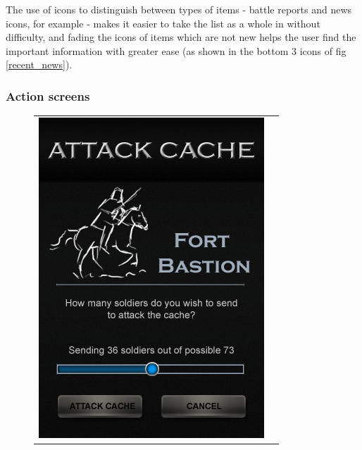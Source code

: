 The use of icons to distinguish between types of items - battle reports and news icons, for example - makes it easier to take the list as a whole in without difficulty, and fading the icons of items which are not new helps the user find the important information with greater ease (as shown in the bottom 3 icons of fig \ref{recent_news}).

\subsubsection{Action screens}

\begin{figure}[h!]
\centering
\begin{tabular}{cc}
	\begin{minipage}{0.3\textwidth}
		\begin{center}
		\begin{minipage}{0.83\textwidth}
		\includegraphics[width=\textwidth]{images/attack_cache_mockup}

\end{minipage}
\end{center}
\end{minipage}
\end{tabular}
\end{figure}

